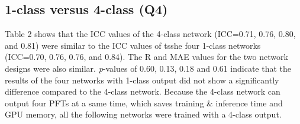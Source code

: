 \begin{table}[tb]
\centering
\caption{PFT\% estimation comparison between two methods.The units of MAE are mL/min/mm Hg for DLCOc and liter for FEV\textsubscript{1}/FVC/TLC. }
\label{chap4_table:PFTpp}
\end{table}



\subsection{1-class versus 4-class (Q4)}

Table 2 shows that the ICC values of the 4-class network (ICC=0.71, 0.76, 0.80, and 0.81) were similar to the ICC values of tsshe four 1-class networks (ICC=0.70, 0.76, 0.76, and 0.84). The R and MAE values for the two network designs were also similar. \textit{p}-values of 0.60, 0.13, 0.18 and 0.61 indicate that the results of the four networks with 1-class output did not show a significantly difference compared to the 4-class network. Because the 4-class network can output four PFTs at a same time, which saves training \& inference time and GPU memory, all the following networks were trained with a 4-class output.

